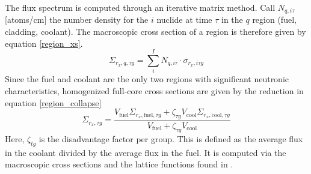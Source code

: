 The flux spectrum is computed through an iterative matrix method.  Call $N_{q,i\tau}$ [atoms/cm] 
the number density for the $i$ nuclide at time $\tau$ in the $q$ region 
(fuel, cladding, coolant).  The macroscopic cross section of a region is therefore given by equation 
\ref{region_xs}.
\begin{equation}
\label{region_xs}
\Sigma_{r_x,q,\tau g} = \sum_i^I N_{q,i\tau} \cdot \sigma_{r_x,i\tau g}
\end{equation}
Since the fuel and coolant are the only two regions with significant neutronic characteristics, 
homogenized full-core cross sections are given by the reduction in equation \ref{region_collapse}
\begin{equation}
\label{region_collapse}
\Sigma_{r_x,\tau g} = \frac{V_{\mbox{fuel}}\Sigma_{r_x,\mbox{fuel},\tau g} + \zeta_{\tau g}V_{\mbox{cool}}\Sigma_{r_x,\mbox{cool},\tau g}}
                           {V_{\mbox{fuel}} + \zeta_{\tau g}V_{\mbox{cool}}}
\end{equation}
Here, $\zeta_{tg}$ is the disadvantage factor per group.  This is defined as the 
average flux in the coolant divided by the average flux in the fuel. It is computed via the macroscopic 
cross sections and the lattice functions found in \cite{Lamarsh2002}.  


